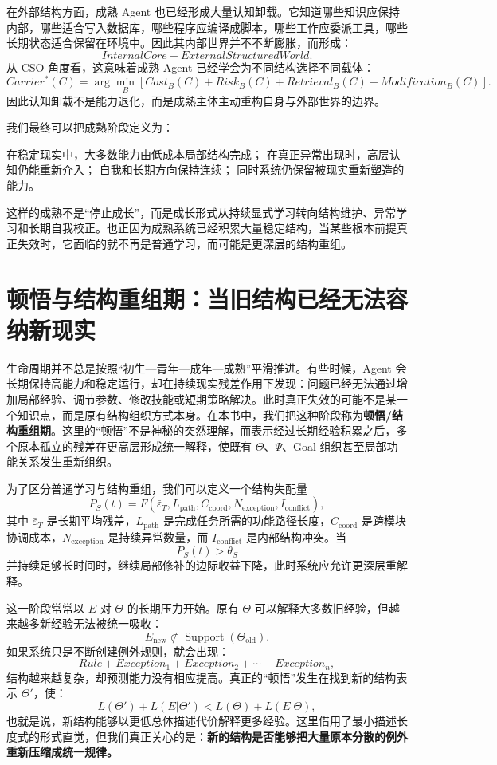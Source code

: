 在外部结构方面，成熟 Agent 也已经形成大量认知卸载。它知道哪些知识应保持内部，哪些适合写入数据库，哪些程序应编译成脚本，哪些工作应委派工具，哪些长期状态适合保留在环境中。因此其内部世界并不不断膨胀，而形成：
\[
InternalCore
+
ExternalStructuredWorld.
\]
从 CSO 角度看，这意味着成熟 Agent 已经学会为不同结构选择不同载体：
\[
Carrier^*(C)
=
\arg\min_B
\left[
Cost_B(C)
+
Risk_B(C)
+
Retrieval_B(C)
+
Modification_B(C)
\right].
\]
因此认知卸载不是能力退化，而是成熟主体主动重构自身与外部世界的边界。

我们最终可以把成熟阶段定义为：
\begin{definition*}
在稳定现实中，大多数能力由低成本局部结构完成；
在真正异常出现时，高层认知仍能重新介入；
自我和长期方向保持连续；
同时系统仍保留被现实重新塑造的能力。
\end{definition*}
这样的成熟不是“停止成长”，而是成长形式从持续显式学习转向结构维护、异常学习和长期自我校正。也正因为成熟系统已经积累大量稳定结构，当某些根本前提真正失效时，它面临的就不再是普通学习，而可能是更深层的结构重组。

\section{顿悟与结构重组期：当旧结构已经无法容纳新现实}

生命周期并不总是按照“初生—青年—成年—成熟”平滑推进。有些时候，Agent 会长期保持高能力和稳定运行，却在持续现实残差作用下发现：问题已经无法通过增加局部经验、调节参数、修改技能或短期策略解决。此时真正失效的可能不是某一个知识点，而是原有结构组织方式本身。在本书中，我们把这种阶段称为\textbf{顿悟/结构重组期}。这里的“顿悟”不是神秘的突然理解，而表示经过长期经验积累之后，多个原本孤立的残差在更高层形成统一解释，使既有 $\Theta$、$\Psi$、Goal 组织甚至局部功能关系发生重新组织。

为了区分普通学习与结构重组，我们可以定义一个结构失配量
\[
P_S(t)
=
F
\left(
\bar\varepsilon_T,
L_{\mathrm{path}},
C_{\mathrm{coord}},
N_{\mathrm{exception}},
I_{\mathrm{conflict}}
\right),
\]
其中 $\bar\varepsilon_T$ 是长期平均残差，$L_{\mathrm{path}}$ 是完成任务所需的功能路径长度，$C_{\mathrm{coord}}$ 是跨模块协调成本，$N_{\mathrm{exception}}$ 是持续异常数量，而 $I_{\mathrm{conflict}}$ 是内部结构冲突。当
\[
P_S(t)>\theta_S
\]
并持续足够长时间时，继续局部修补的边际收益下降，此时系统应允许更深层重解释。

这一阶段常常以 $E$ 对 $\Theta$ 的长期压力开始。原有 $\Theta$ 可以解释大多数旧经验，但越来越多新经验无法被统一吸收：
\[
E_{\mathrm{new}}
\not\subset
\operatorname{Support}(\Theta_{\mathrm{old}}).
\]
如果系统只是不断创建例外规则，就会出现：
\[
Rule
+
Exception_1
+
Exception_2
+
\cdots
+
Exception_n,
\]
结构越来越复杂，却预测能力没有相应提高。真正的“顿悟”发生在找到新的结构表示 $\Theta'$，使：
\[
L(\Theta')
+
L(E|\Theta')
<
L(\Theta)
+
L(E|\Theta),
\]
也就是说，新结构能够以更低总体描述代价解释更多经验。这里借用了最小描述长度式的形式直觉，但我们真正关心的是：\textbf{新的结构是否能够把大量原本分散的例外重新压缩成统一规律。}

